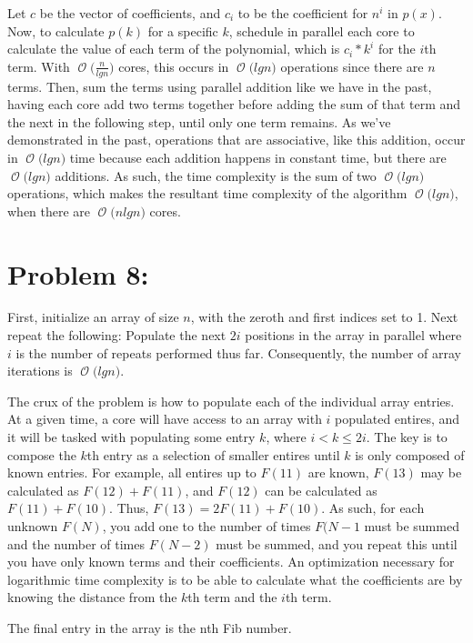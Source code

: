 \documentclass[12pt]{article}
\newcommand{\BigO}[1]{\ensuremath{\operatorname{\mathcal{O}}\bigl(#1\bigr)}}
\begin{document}
Let $c$ be the vector of coefficients, and $c_i$ to be the coefficient for $n^{i}$ in $p(x)$. Now, to calculate $p(k)$ for a specific $k$, schedule in parallel each core to calculate the value of each term of the polynomial, which is $c_{i}*k^{i}$ for the $i$th term. With \BigO{\frac{n}{lg n}} cores, this occurs in \BigO{lg n} operations since there are $n$ terms. Then, sum the terms using parallel addition like we have in the past, having each core add two terms together before adding the sum of that term and the next in the following step, until only one term remains. As we've demonstrated in the past, operations that are associative, like this addition, occur in \BigO{lg n} time because each addition happens in constant time, but there are \BigO{lg n} additions. As such, the time complexity is the sum of two \BigO{lg n} operations, which makes the resultant time complexity of the algorithm \BigO{lg n}, when there are \BigO{n lg n} cores.

\section*{Problem 8: }

First, initialize an array of size $n$, with the zeroth and first indices set to 1. Next repeat the following: Populate the next $2i$ positions in the array in parallel where $i$ is the number of repeats performed thus far. Consequently, the number of array iterations is \BigO{lg n}. 

The crux of the problem is how to populate each of the individual array entries. At a given time, a core will have access to an array with $i$ populated entires, and it will be tasked with populating some entry $k$, where $i < k \leq 2i$. The key is to compose the $k$th entry as a selection of smaller entires until $k$ is only composed of known entries.  For example, all entires up to $F(11)$ are known, $F(13)$ may be calculated as $F(12) + F(11)$, and $F(12)$ can be calculated as $F(11) + F(10)$. Thus, $F(13) =  2F(11) + F(10)$. As such, for each unknown $F(N)$, you add one to the number of times $F(N-1$ must be summed and the number of times $F(N-2)$ must be summed, and you repeat this until you have only known terms and their coefficients. An optimization necessary for logarithmic time complexity is to be able to calculate what the coefficients are by knowing the distance from the $k$th term and the $i$th term. 

The final entry in the array is the nth Fib number.
\end{document}
